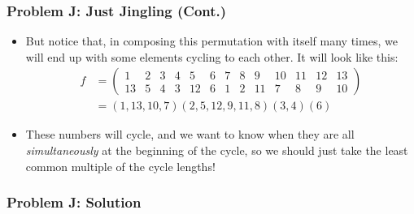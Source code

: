 \begin{frame}
  \frametitle{Problem J: Just Jingling (Cont.)}
  \begin{itemize}
    \item But notice that, in composing this permutation with itself many times, we will end up with 
      some elements cycling to each other. It will look like this:
      \begin{align*}
        f &= \begin{pmatrix} 1 & 2 & 3 & 4 & 5 & 6 & 7 & 8 & 9 & 10 & 11 & 12 & 13\\
      13 & 5 & 4 & 3 & 12 & 6 & 1 & 2 & 11 & 7 & 8 & 9 & 10 \end{pmatrix}\\
        &= (1,13,10,7)(2,5,12,9,11,8)(3,4)(6)
      \end{align*}
    \item These numbers will cycle, and we want to know when they are all \textit{simultaneously}
      at the beginning of the cycle, so we should just take the least common multiple of the cycle lengths!
  \end{itemize}
\end{frame}

\begin{frame}
  \frametitle{Problem J: Solution}
\end{frame}
\begin{frame}
\end{frame}
\begin{frame}
\end{frame}
\begin{frame}
\end{frame}

